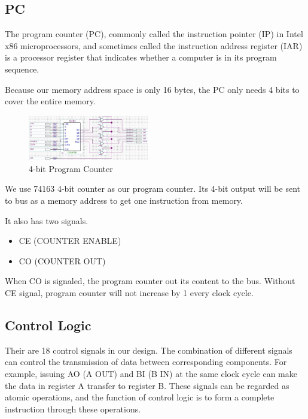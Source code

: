 \subsection{PC}

The program counter (PC), commonly called the instruction pointer (IP) in Intel x86 microprocessors, and sometimes called the instruction address register (IAR) is a processor register that indicates whether a computer is in its program sequence.

Because our memory address space is only 16 bytes, the PC only needs 4 bits to cover the entire memory.

\begin{figure}[th]
	\includegraphics[width=0.47\textwidth]{figures/pc}
	\centering
	\caption{4-bit Program Counter}
	\label{fig:pc}
\end{figure}

We use 74163 4-bit counter as our program counter. Its 4-bit output will be sent to bus as a memory address to get one instruction from memory.

It also has two signals.

\begin{itemize}
	\item CE (COUNTER ENABLE)
	\item CO (COUNTER OUT)
\end{itemize}

When CO is signaled, the program counter out its content to the bus. Without CE signal, program counter will not increase by 1 every clock cycle.


\subsection{Control Logic}

Their are 18 control signals in our design. The combination of different signals can control the transmission of data between corresponding components. For example, issuing AO (A OUT) and BI (B IN) at the same clock cycle can make the data in register A transfer to register B. These signals can be regarded as atomic operations, and the function of control logic is to form a complete instruction through these operations.

